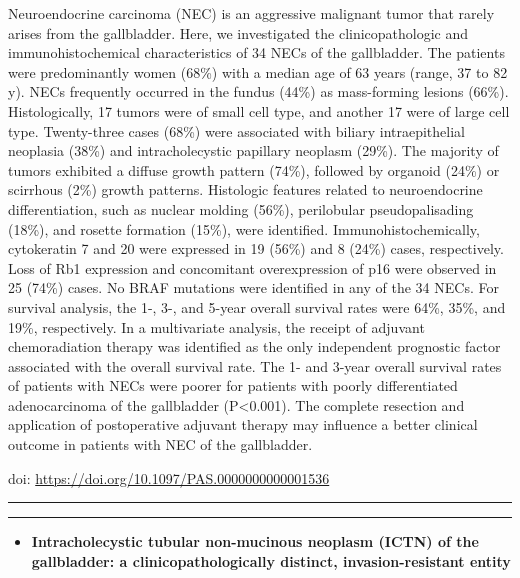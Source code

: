 \documentclass[
]{article}
\providecommand{\tightlist}{%
  \setlength{\itemsep}{0pt}\setlength{\parskip}{0pt}}
\begin{document}
Neuroendocrine carcinoma (NEC) is an aggressive malignant tumor that
rarely arises from the gallbladder. Here, we investigated the
clinicopathologic and immunohistochemical characteristics of 34 NECs of
the gallbladder. The patients were predominantly women (68\%) with a
median age of 63 years (range, 37 to 82 y). NECs frequently occurred in
the fundus (44\%) as mass-forming lesions (66\%). Histologically, 17
tumors were of small cell type, and another 17 were of large cell type.
Twenty-three cases (68\%) were associated with biliary intraepithelial
neoplasia (38\%) and intracholecystic papillary neoplasm (29\%). The
majority of tumors exhibited a diffuse growth pattern (74\%), followed
by organoid (24\%) or scirrhous (2\%) growth patterns. Histologic
features related to neuroendocrine differentiation, such as nuclear
molding (56\%), perilobular pseudopalisading (18\%), and rosette
formation (15\%), were identified. Immunohistochemically, cytokeratin 7
and 20 were expressed in 19 (56\%) and 8 (24\%) cases, respectively.
Loss of Rb1 expression and concomitant overexpression of p16 were
observed in 25 (74\%) cases. No BRAF mutations were identified in any of
the 34 NECs. For survival analysis, the 1-, 3-, and 5-year overall
survival rates were 64\%, 35\%, and 19\%, respectively. In a
multivariate analysis, the receipt of adjuvant chemoradiation therapy
was identified as the only independent prognostic factor associated with
the overall survival rate. The 1- and 3-year overall survival rates of
patients with NECs were poorer for patients with poorly differentiated
adenocarcinoma of the gallbladder (P\textless0.001). The complete
resection and application of postoperative adjuvant therapy may
influence a better clinical outcome in patients with NEC of the
gallbladder.

doi: \url{https://doi.org/10.1097/PAS.0000000000001536}

\begin{center}\rule{0.5\linewidth}{0.5pt}\end{center}

\begin{center}\rule{0.5\linewidth}{0.5pt}\end{center}

\begin{itemize}
\tightlist
\item
  \textbf{Intracholecystic tubular non-mucinous neoplasm (ICTN) of the
  gallbladder: a clinicopathologically distinct, invasion-resistant
  entity}
\end{itemize}
\end{document}

